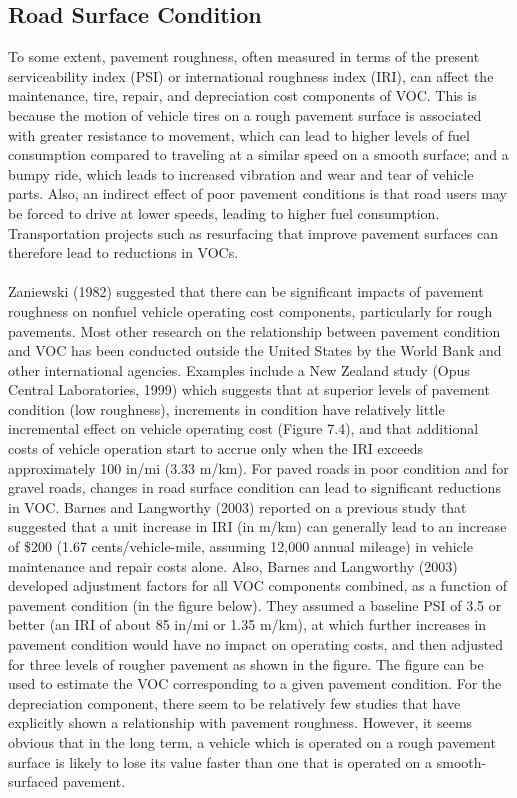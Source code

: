 \subsection{Road Surface Condition}
To some extent, pavement roughness, often measured in terms of the present serviceability index (PSI) or international roughness index (IRI), can affect the maintenance, tire, repair, and depreciation cost components of VOC. This is because the motion of vehicle tires on a rough pavement surface is associated with greater resistance to movement, which can lead to higher levels of fuel consumption compared to traveling at a similar speed on a smooth surface; and a bumpy ride, which leads to increased vibration and wear and tear of vehicle parts. Also, an indirect effect of poor pavement conditions is that road users may be forced to drive at lower speeds, leading to higher fuel consumption. Transportation projects such as resurfacing that improve pavement surfaces can therefore lead to reductions in VOCs.\\\\
Zaniewski (1982) suggested that there can be significant impacts of pavement roughness on nonfuel vehicle operating cost components, particularly for rough pavements. Most other research on the relationship between pavement condition and VOC has been conducted outside the United States by the World Bank and other international agencies. Examples include a New Zealand study (Opus Central Laboratories, 1999) which suggests that at superior levels of pavement condition (low roughness), increments in condition have relatively little incremental effect on vehicle operating cost (Figure 7.4), and that additional costs of vehicle operation start to accrue only when the IRI exceeds approximately 100 in/mi (3.33 m/km). For paved roads in poor condition and for gravel roads, changes in road surface condition can lead to significant reductions in VOC. Barnes and Langworthy (2003) reported on a previous study that suggested that a unit increase in IRI (in m/km) can generally lead to an increase of \$200 (1.67 cents/vehicle-mile, assuming 12,000 annual mileage) in vehicle maintenance and repair costs alone. Also, Barnes and Langworthy (2003) developed adjustment factors for all VOC components combined, as a function of pavement condition (in the figure below). They assumed a baseline PSI of 3.5 or better (an IRI of about 85 in/mi or 1.35 m/km), at which further increases in pavement condition would have no impact on operating costs, and then adjusted for three levels of rougher pavement as shown in the figure. The figure can be used to estimate the VOC corresponding to a given pavement condition. For the depreciation component, there seem to be relatively few studies that have explicitly shown a relationship with pavement roughness. However, it seems obvious that in the long term, a vehicle which is operated on a rough pavement surface is likely to lose its value faster than one that is operated on a smooth-surfaced pavement.
